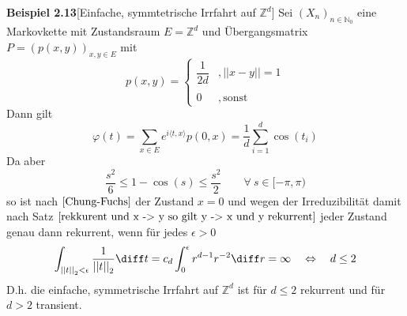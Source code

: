 \textbf{Beispiel 2.13}[Einfache, symmtetrische Irrfahrt auf $\mathbb{Z}^{d}$]
Sei $(X_{n})_{n \in \mathbb{N}_{0}}$ eine Markovkette mit Zustandsraum $E= \mathbb{Z}^{d}$ und Übergangsmatrix $P = (p(x,y))_{x,y \in E}$ mit
\begin{equation*}
p(x,y)=
\begin{cases}
\dfrac{1}{2d} & , \vert \vert x - y \vert \vert = 1\\
& \\
0 & , \mathrm{sonst}
\end{cases}
\end{equation*}
Dann gilt 
\begin{equation*}
\varphi (t) = \sum_{x \in E} e^{i \langle t,x \rangle} p(0,x) = \dfrac{1}{d} \sum_{i=1}^{d} \cos(t_{i})
\end{equation*}
Da aber 
\begin{equation*}
\dfrac{s^{2}}{6} \leq 1 - \cos(s) \leq \dfrac{s^{2}}{2} \qquad \forall \: s \in [- \pi, \pi)
\end{equation*}
so ist nach $\ref{Chung-Fuchs}$ der Zustand $x=0$ und wegen der Irreduzibilität damit nach Satz $\ref{rekkurent und x -> y so gilt y -> x und y rekurrent}$ jeder Zustand genau dann rekurrent, wenn für jedes $\epsilon > 0$
\begin{equation*}
\int_{{\vert \vert t \vert \vert}_{2} < \epsilon} \dfrac{1}{{\vert \vert t \vert \vert}_{2}} \diff t = c_{d} \int_{0}^{\epsilon} r^{d-1} r^{-2} \diff r = \infty \quad \Leftrightarrow \quad d \leq 2
\end{equation*}
D.h. die einfache, symmetrische Irrfahrt auf $\mathbb{Z}^{d}$ ist für $d \leq 2$ rekurrent und für $d>2$ transient.

